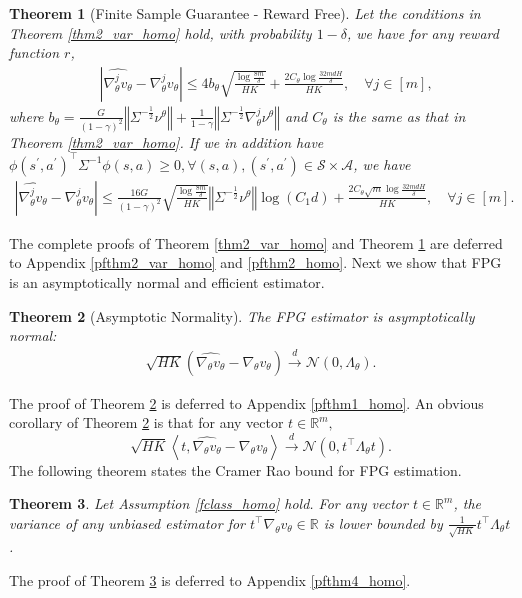 \documentclass{article}
\newtheorem{theorem}{Theorem}[section]
\numberwithin{equation}{section}
\begin{document}
\begin{theorem}[Finite Sample Guarantee - Reward Free]
\label{thm2_homo}
Let the conditions in Theorem \ref{thm2_var_homo} hold, with probability $1-\delta$, we have for any reward function $r$,
\begin{align*}
&\left\vert\widehat{\nabla_\theta^j v_\theta}-\nabla_\theta^j v_\theta\right\vert\leq 4b_\theta\sqrt{\frac{\log\frac{8m}{\delta}}{HK}}+\frac{2C_\theta\log\frac{32mdH}{\delta}}{HK}, \quad\forall j\in[m],
\end{align*}
where $b_\theta=\frac{G}{(1-\gamma)^2}\left\Vert\Sigma^{-\frac{1}{2}}\nu^\theta\right\Vert+\frac{1}{1-\gamma}\left\Vert\Sigma^{-\frac{1}{2}}\nabla_\theta^j\nu^\theta\right\Vert$ and $C_\theta$ is the same as that in Theorem \ref{thm2_var_homo}. If we in addition have $\phi(s^\prime,a^\prime)^\top\Sigma^{-1}\phi(s,a)\geq 0,\forall (s,a),(s^\prime,a^\prime)\in\mathcal{S}\times\mathcal{A}$, we have
\begin{align*}
\left\vert\widehat{\nabla_\theta^j v_\theta}-\nabla_\theta^j v_\theta\right\vert\leq \frac{16G}{(1-\gamma)^2}\sqrt{\frac{\log\frac{8m}{\delta}}{HK}}\left\Vert\Sigma^{-\frac{1}{2}}\nu^\theta\right\Vert\log(C_1d)+\frac{2C_\theta\sqrt{m}\log\frac{32mdH}{\delta}}{HK},\quad\forall j\in[m].
\end{align*}
\end{theorem}
The complete proofs of Theorem \ref{thm2_var_homo} and Theorem \ref{thm2_homo} are deferred to Appendix \ref{pfthm2_var_homo} and \ref{pfthm2_homo}. Next we show that FPG is an asymptotically normal and efficient estimator. 
\begin{theorem}[Asymptotic Normality]
\label{thm1_homo}
The FPG estimator is asymptotically normal:
\begin{align*}
    \sqrt{HK}\left(\widehat{\nabla_\theta v_\theta}-\nabla_\theta v_\theta\right)\stackrel{d}{\rightarrow}\mathcal{N}(0,\Lambda_\theta).
\end{align*}
\end{theorem}
The proof of Theorem \ref{thm1_homo} is deferred to Appendix \ref{pfthm1_homo}. An obvious corollary of Theorem \ref{thm1_homo} is that for any vector $t \in \mathbb{R}^m,$ 
\begin{equation*}
    \sqrt{HK}\left\langle t,  \widehat{\nabla_{\theta} v_{\theta}} -\nabla_{\theta} v_{\theta} \right\rangle \stackrel{d}{\rightarrow} \mathcal{N}\left(0, t^{\top} \Lambda_{\theta} t\right).
\end{equation*}
The following theorem states the Cramer Rao bound for FPG estimation. 
\begin{theorem}
\label{thm4_homo}
Let Assumption \ref{fclass_homo} hold. For any vector $t\in\mathbb{R}^m$, the variance of any unbiased estimator for $t^{\top}\nabla_{\theta}v_{\theta}  \in \mathbb{R}$ is lower bounded by $\frac{1}{\sqrt{HK}}t^{\top} \Lambda_{\theta} t$.
\end{theorem}
The proof of Theorem \ref{thm4_homo} is deferred to Appendix \ref{pfthm4_homo}. 
\end{document}
